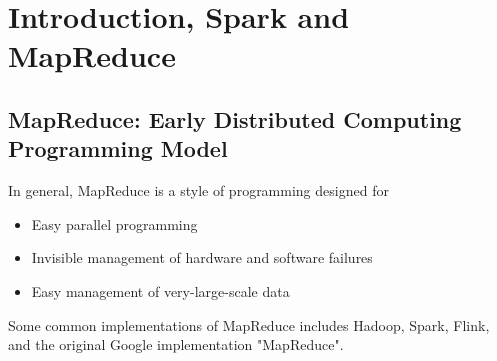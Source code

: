\chapter{Introduction, Spark and MapReduce} 
\section{MapReduce: Early Distributed Computing Programming Model} 
In general, MapReduce is a style of programming designed for 
    \begin{itemize}
        \item Easy parallel programming 
        \item Invisible management of hardware and software failures
        \item Easy management of very-large-scale data
    \end{itemize}
Some common implementations of MapReduce includes Hadoop, Spark, Flink, and the original Google implementation "MapReduce". 


